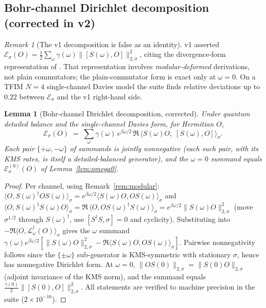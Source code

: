 \documentclass[11pt]{article}
\newtheorem{lemma}[theorem]{Lemma}
\theoremstyle{remark}
\newtheorem{remark}[theorem]{Remark}
\newcommand{\kms}[1]{\|#1\|_{2,\sigma}}
\begin{document}
\subsection{Bohr-channel Dirichlet decomposition (corrected in v2)}
\begin{remark}[The v1 decomposition is false as an identity]
\label{rem:43false}
v1 asserted $\mathcal{E}_\sigma(O) = \frac12 \sum_\omega \gamma(\omega)
\kms{[S(\omega), O]}^2$, citing the divergence-form representation of
\cite{CM}. That representation involves \emph{modular-deformed}
derivations, not plain commutators; the plain-commutator form is exact only
at $\omega = 0$. On a TFIM $N = 4$ single-channel Davies model the suite
finds relative deviations up to $0.22$ between $\mathcal{E}_\sigma$ and the
v1 right-hand side.
\end{remark}
\begin{lemma}[Bohr-channel Dirichlet decomposition, corrected]
\label{lem:bohr}
Under quantum detailed balance and the single-channel Davies form,
for Hermitian $O$,
\[
\mathcal{E}_\sigma(O) \;=\; \sum_\omega \gamma(\omega)\, e^{\beta\omega/2}\,
\Re\,\bigl\langle S(\omega) O,\; [S(\omega), O] \bigr\rangle_\sigma .
\]
Each pair $\{+\omega, -\omega\}$ of summands is jointly nonnegative
(each such pair, with its KMS rates, is itself a detailed-balanced
generator), and the $\omega = 0$ summand equals
$\mathcal{E}^{(0)}_\sigma(O)$ of Lemma~\ref{lem:omega0}.
\end{lemma}
\begin{proof}
Per channel, using Remark~\ref{rem:modular}:
$\langle O, S(\omega)^\dagger O S(\omega)\rangle_\sigma =
e^{\beta\omega/2}\langle S(\omega) O, O S(\omega)\rangle_\sigma$ and
$\langle O, S(\omega)^\dagger S(\omega) O\rangle_\sigma =
\Re\,\langle O, O S(\omega)^\dagger S(\omega)\rangle_\sigma =
e^{\beta\omega/2}\kms{S(\omega) O}^2$ (move $\sigma^{1/2}$ through
$S(\omega)^\dagger$, use $[S^\dagger S, \sigma] = 0$ and cyclicity).
Substituting into $-\Re\langle O, \mathcal{L}^\dagger_\omega(O)
\rangle_\sigma$ gives the $\omega$ summand
$\gamma(\omega)e^{\beta\omega/2}[\kms{S(\omega)O}^2 -
\Re\langle S(\omega)O, OS(\omega)\rangle_\sigma]$. Pairwise nonnegativity
follows since the $\{\pm\omega\}$ sub-generator is KMS-symmetric with
stationary $\sigma$, hence has nonnegative Dirichlet form. At $\omega = 0$,
$\kms{OS(0)} = \kms{S(0)O}$ (adjoint invariance of the KMS norm), and the
summand equals $\tfrac{\gamma(0)}{2}\kms{[S(0),O]}^2$. All statements are
verified to machine precision in the suite ($2\times10^{-16}$).
\end{proof}
\end{document}
